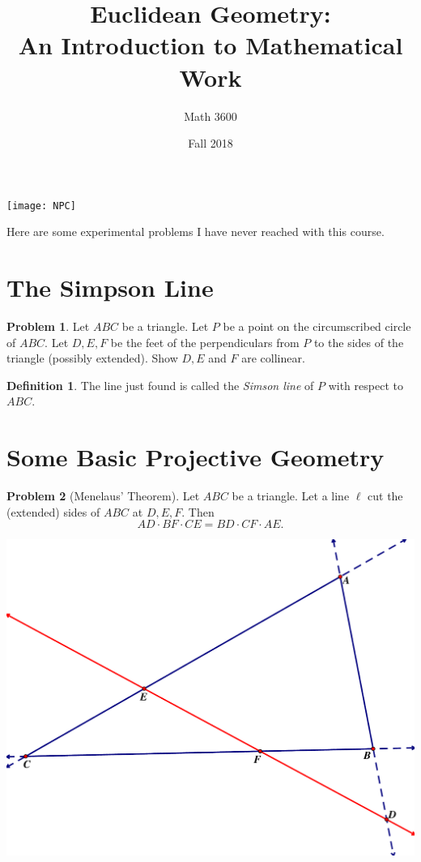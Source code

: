 \documentclass{tufte-handout}
\title{Euclidean Geometry:\\An Introduction to Mathematical Work}
\author[]{Math 3600}
\date{Fall 2018}
\theoremstyle{definition}
\newtheorem{problem}{Problem}[section]
\newtheorem*{definition}{Definition}
\begin{document}
\maketitle

\begin{marginfigure}
    \texttt{[image: NPC]}
\end{marginfigure}

\vspace{.5in}
Here are some experimental problems I have never reached with this course.

\setcounter{section}{19}
\section{The Simpson Line}

\begin{problem}\label{prob:Simson-line}
Let $ABC$ be a triangle. Let $P$ be a point on the circumscribed circle of $ABC$. Let $D, E, F$ be the feet of the perpendiculars from $P$ to the sides of the triangle (possibly extended). Show $D, E$ and $F$ are collinear.
\end{problem}

\begin{definition}\label{defn:Simson-line}
The line just found is called the \emph{Simson line} of $P$ with respect to $ABC$.
\end{definition}


\section{Some Basic Projective Geometry}

\begin{problem}[Menelaus' Theorem]\label{prob:Menelaus-theorem}
Let $ABC$ be a triangle. Let a line $\ell$ cut the (extended) sides of $ABC$ at $D, E, F$. Then
\[ AD\cdot BF \cdot CE = BD \cdot CF \cdot AE .\]
\end{problem}


\begin{center}
\includegraphics[width=.9\textwidth]{Menelaus.pdf}
\end{center}
\end{document}
